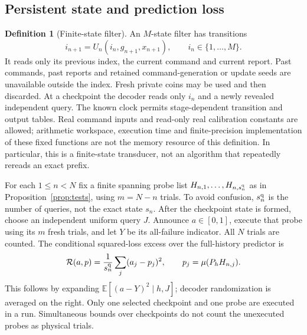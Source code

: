 \documentclass[11pt]{amsart}
\theoremstyle{definition}\newtheorem{definition}[theorem]{Definition}
\theoremstyle{remark}\newtheorem{remark}[theorem]{Remark}
\newcommand{\E}{\mathbb E}\newcommand{\Prob}{\mathbb P}
\begin{document}
\subsection{Persistent state and prediction loss}
\begin{definition}[Finite-state filter]\label{def:finite-state}
An $M$-state filter has transitions
\[
 i_{n+1}=U_n(i_n,g_{n+1},x_{n+1}),\qquad i_n\in\{1,\ldots,M\}.
\]
It reads only its previous index, the current command and current report.
Past commands, past reports and retained command-generation or update seeds
are unavailable outside the index. Fresh private coins may be used and
then discarded. At a checkpoint the decoder reads only $i_n$ and a newly
revealed independent query. The known clock permits stage-dependent
transition and output tables. Real command inputs and read-only real
calibration constants are allowed; arithmetic workspace, execution time and
finite-precision implementation of these fixed functions are not the memory
resource of this definition. In particular, this is a finite-state
transducer, not an algorithm that repeatedly rereads an exact prefix.
\end{definition}

For each $1\le n<N$ fix a finite spanning probe list
$H_{n,1},\ldots,H_{n,s_n^{\rm q}}$ as in
Proposition~\ref{prop:tests}, using $m=N-n$ trials. To avoid confusion,
$s_n^{\rm q}$ is the number of queries, not the exact state $s_n$.
After the checkpoint state is formed, choose an independent uniform query
$J$. Announce $a\in[0,1]$, execute that probe using its $m$ fresh trials,
and let $Y$ be its all-failure indicator. All $N$ trials are counted.
The conditional squared-loss excess over the full-history predictor is
\begin{equation}\label{eq:brier}
 \mathcal R(a,p)=\frac1{s_n^{\rm q}}\sum_j(a_j-p_j)^2,
 \qquad p_j=\mu(P_hH_{n,j}).
\end{equation}
This follows by expanding $\E[(a-Y)^2\mid h,J]$; decoder randomization
is averaged on the right. Only one selected checkpoint and one probe are
executed in a run. Simultaneous bounds over checkpoints do not count the
unexecuted probes as physical trials.
\end{document}
